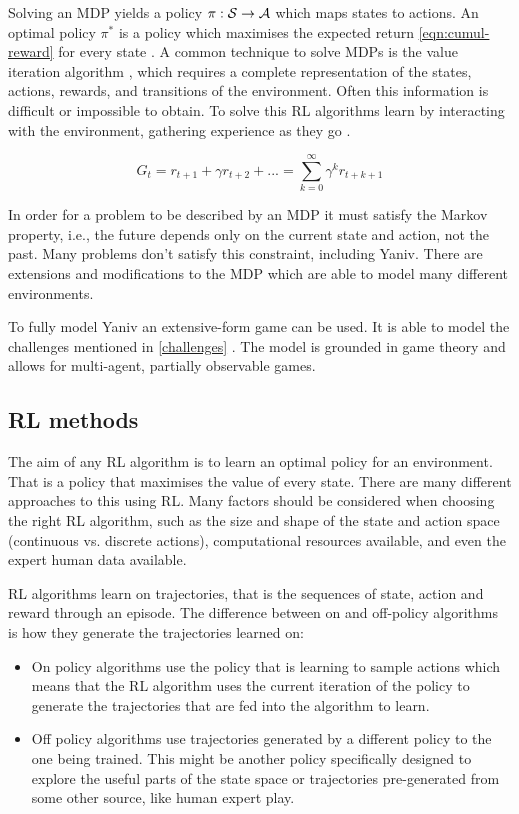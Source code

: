 \documentclass[../main.tex]{subfiles}
\begin{document}
Solving an MDP yields a policy $\pi : \mathcal{S} \rightarrow \mathcal{A}$ which maps states to actions. An optimal policy $\pi^*$ is a policy which maximises the expected return \eqref{eqn:cumul-reward} for every state \cite{silver_lectures_2015}. A common technique to solve MDPs is the value iteration algorithm \cite{bellman_markovian_1957}, which requires a complete representation of the states, actions, rewards, and transitions of the environment. Often this information is difficult or impossible to obtain. To solve this RL algorithms learn by interacting with the environment, gathering experience as they go \cite{sutton_reinforcement_2018}. 

\begin{equation}
G_t = r_{t+1} + \gamma r_{t+2} + ... = \sum_{k=0}^{\infty} \gamma^k r_{t+k+1}
\label{eqn:cumul-reward}
\end{equation}

In order for a problem to be described by an MDP it must satisfy the Markov property, i.e., the future depends only on the current state and action, not the past. Many problems don't satisfy this constraint, including Yaniv. There are extensions and modifications to the MDP which are able to model many different environments.

To fully model Yaniv an extensive-form game can be used. It is able to model the challenges mentioned in \cref{challenges} \cite{jiang_deltadou_2019, heinrich_deep_2016}. The model is grounded in game theory and allows for multi-agent, partially observable games. 

\subsection{RL methods}
The aim of any RL algorithm is to learn an optimal policy for an environment. That is a policy that maximises the value of every state. There are many different approaches to this using RL. Many factors should be considered when choosing the right RL algorithm, such as the size and shape of the state and action space (continuous vs. discrete actions), computational resources available, and even the expert human data available. 

RL algorithms learn on trajectories, that is the sequences of state, action and reward through an episode. The difference between on and off-policy algorithms is how they generate the trajectories learned on:

\begin{itemize}
    \item  On policy algorithms use the policy that is learning to sample actions which means that the RL algorithm uses the current iteration of the policy to generate the trajectories that are fed into the algorithm to learn. 
    \item  Off policy algorithms use trajectories generated by a different policy to the one being trained. This might be another policy specifically designed to explore the useful parts of the state space or trajectories pre-generated from some other source, like human expert play. 
\end{itemize}
\end{document}
